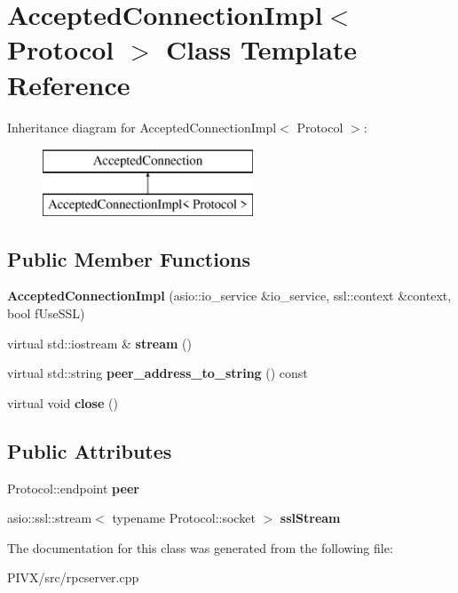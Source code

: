 \hypertarget{class_accepted_connection_impl}{}\section{Accepted\+Connection\+Impl$<$ Protocol $>$ Class Template Reference}
\label{class_accepted_connection_impl}
Inheritance diagram for Accepted\+Connection\+Impl$<$ Protocol $>$\+:\begin{figure}[H]
\begin{center}
\leavevmode
\includegraphics[height=2.000000cm]{class_accepted_connection_impl}
\end{center}
\end{figure}
\subsection*{Public Member Functions}
\begin{DoxyCompactItemize}
\item 
\mbox{\label{class_accepted_connection_impl_adaf674801c89a76de0bbb4154f2cf3b8}} 
{\bfseries Accepted\+Connection\+Impl} (asio\+::io\+\_\+service \&io\+\_\+service, ssl\+::context \&context, bool f\+Use\+S\+SL)
\item 
\mbox{\label{class_accepted_connection_impl_ab15396a413e40f947b7d527a2afe37fa}} 
virtual std\+::iostream \& {\bfseries stream} ()
\item 
\mbox{\label{class_accepted_connection_impl_ac9842ed342c2cbabb9c0dc4f7e1e9d0a}} 
virtual std\+::string {\bfseries peer\+\_\+address\+\_\+to\+\_\+string} () const
\item 
\mbox{\label{class_accepted_connection_impl_a1b114863c047cae57ce42564f9a29be1}} 
virtual void {\bfseries close} ()
\end{DoxyCompactItemize}
\subsection*{Public Attributes}
\begin{DoxyCompactItemize}
\item 
\mbox{\label{class_accepted_connection_impl_ade939b7d2778690cf78a9f6719f47c76}} 
Protocol\+::endpoint {\bfseries peer}
\item 
\mbox{\label{class_accepted_connection_impl_afcfc99c020d301985bc19b4075fc7e78}} 
asio\+::ssl\+::stream$<$ typename Protocol\+::socket $>$ {\bfseries ssl\+Stream}
\end{DoxyCompactItemize}


The documentation for this class was generated from the following file\+:\begin{DoxyCompactItemize}
\item 
P\+I\+V\+X/src/rpcserver.\+cpp\end{DoxyCompactItemize}
